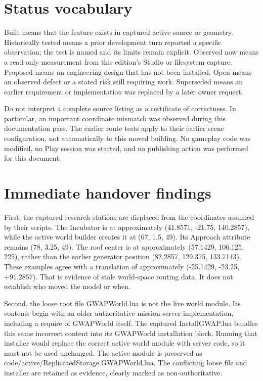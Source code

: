 \section{Status vocabulary}
Built means that the feature exists in captured active source or geometry.\allowbreak{} Historically tested means a prior development turn reported a specific observation; the test is named and its limits remain explicit.\allowbreak{} Observed now means a read-only measurement from this edition's Studio or filesystem capture.\allowbreak{} Proposed means an engineering design that has not been installed.\allowbreak{} Open means an observed defect or a stated risk still requiring work.\allowbreak{} Superseded means an earlier requirement or implementation was replaced by a later owner request.\allowbreak{}

Do not interpret a complete source listing as a certificate of correctness.\allowbreak{} In particular, an important coordinate mismatch was observed during this documentation pass.\allowbreak{} The earlier route tests apply to their earlier scene configuration, not automatically to this moved building.\allowbreak{} No gameplay code was modified, no Play session was started, and no publishing action was performed for this document.\allowbreak{}

\section{Immediate handover findings}
First, the captured research stations are displaced from the coordinates assumed by their scripts.\allowbreak{} The Incubator is at approximately (41.\allowbreak{}8571, -21.\allowbreak{}75, 140.\allowbreak{}2857), while the active world builder creates it at (67, 1.\allowbreak{}5, 49).\allowbreak{} Its Approach attribute remains (78, 3.\allowbreak{}25, 49).\allowbreak{} The roof center is at approximately (57.\allowbreak{}1429, 106.\allowbreak{}125, 225), rather than the earlier generator position (82.\allowbreak{}2857, 129.\allowbreak{}375, 133.\allowbreak{}7143).\allowbreak{} These examples agree with a translation of approximately (-25.\allowbreak{}1429, -23.\allowbreak{}25, +91.\allowbreak{}2857).\allowbreak{} That is evidence of stale world-space routing data.\allowbreak{} It does not establish who moved the model or when.\allowbreak{}

Second, the loose root file GWAPWorld.\allowbreak{}lua is not the live world module.\allowbreak{} Its contents begin with an older authoritative mission-server implementation, including a require of GWAPWorld itself.\allowbreak{} The captured InstallGWAP.\allowbreak{}lua bundles this same incorrect content into its GWAPWorld installation block.\allowbreak{} Running that installer would replace the correct active world module with server code, so it must not be used unchanged.\allowbreak{} The active module is preserved as code/\allowbreak{}active/\allowbreak{}ReplicatedStorage.\allowbreak{}GWAPWorld.\allowbreak{}lua.\allowbreak{} The conflicting loose file and installer are retained as evidence, clearly marked as non-authoritative.\allowbreak{}

